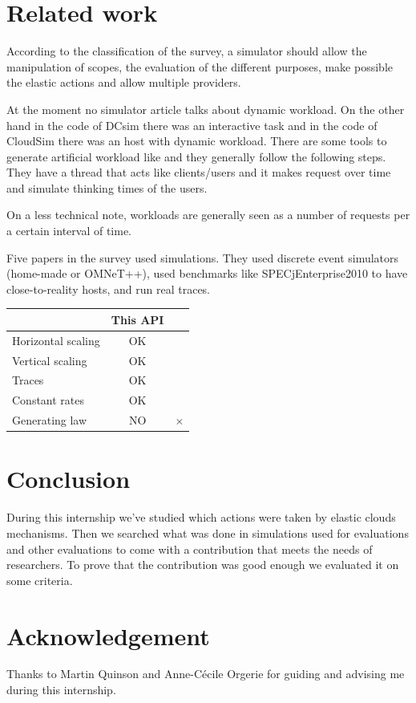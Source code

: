 \documentclass[a4paper, onecolumn]{article}
\begin{document}
\section{Related work} \label{sota}
According to the classification of the survey, a simulator should allow the
manipulation of scopes, the evaluation of the different purposes, make
possible the elastic actions and allow multiple providers.

At the moment no simulator article talks about dynamic workload. On the other
hand in the code of DCsim \cite{tighe2013towards} there was an interactive
task and in the code of CloudSim \cite{calheiros2011cloudsim} there was an
host with dynamic workload. There are some tools to generate artificial
workload like \cite{bodik2010characterizing} and they generally follow the
following steps. They have a thread that acts like clients/users and it makes
request over time and simulate thinking times of the users.

On a less technical note, workloads are generally seen as a number of 
requests per a certain interval of time.

Five papers in the survey used simulations. They used discrete event 
simulators (home-made or OMNeT++), used benchmarks like SPECjEnterprise2010 
to have close-to-reality hosts, and run real traces.

  \begin{center}
  	\begin{tabular}{| l | c | c |}
  		\hline
  		 & This API & \cite{vasic2012dejavu}\\ 
  		\hline\hline
  		Horizontal scaling & OK & \checkmark\\
  		\hline
  		Vertical scaling & OK & \checkmark\\
  		\hline\hline
  		Traces & OK & \\
  		\hline
  		Constant rates & OK & \\
  		\hline
  		Generating law & NO & $\times$ \\
  		\hline
  	\end{tabular}
  \end{center}
  

\section{Conclusion} \label{conclu}
During this internship we've studied which actions were taken by elastic clouds 
mechanisms. Then we searched what was done in simulations used for evaluations 
and other evaluations to come with a contribution that meets the needs of 
researchers. To prove that the contribution was good enough we evaluated it on 
some criteria.


\section*{Acknowledgement}
Thanks to Martin Quinson and Anne-C\'ecile Orgerie for guiding and advising me 
during this internship.




\end{document}

